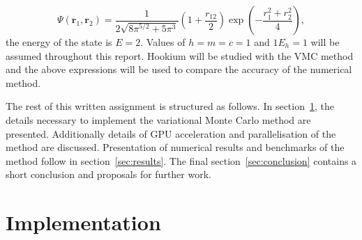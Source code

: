 \documentclass[final,3p,times,twocolumn]{elsarticle}
\begin{document}
	\begin{equation}
		\Psi\left(\mathbf{r}_{1}, \mathbf{r}_{2}\right)=\frac{1}{2 \sqrt{8 \pi^{5 / 2}+5 \pi^{3}}}\left(1+\frac{r_{12}}{2}\right) \exp \left(-\frac{r_{1}^{2}+r_{2}^{2}}{4}\right), 
	\end{equation}
	the energy of the state is $E=2$. 
	Values of $h=m=c=1$ and $1E_h = 1$ will be assumed throughout this report. 
	Hookium will be studied with the VMC method and the above expressions will be used to compare the accuracy of the numerical method.
	
	The rest of this written assignment is structured as follows. In section~\ref{sec:impl}, the details necessary to implement the variational Monte Carlo method are presented. Additionally details of GPU acceleration and parallelisation of the method are discussed. Presentation of numerical results and benchmarks of the method follow in section~\ref{sec:results}. The final section~\ref{sec:conclusion} contains a short conclusion and proposals for further work. 
	\section{Implementation}
	\label{sec:impl}
	
\end{document}
